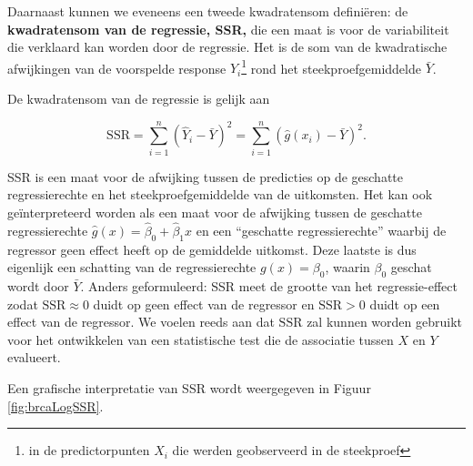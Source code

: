 \documentclass[
  12pt,dutch]{book}
\theoremstyle{definition}
\theoremstyle{definition}
\theoremstyle{definition}
\theoremstyle{definition}
\theoremstyle{remark}
\begin{document}
Daarnaast kunnen we eveneens een tweede kwadratensom definiëren: de \textbf{kwadratensom van de regressie, SSR,} die een maat is voor de variabiliteit die verklaard kan worden door de regressie. Het is de som van de kwadratische afwijkingen van de voorspelde response \(\hat{Y}_i\)\footnote{in de predictorpunten \(X_i\) die werden geobserveerd in de steekproef} rond het steekproefgemiddelde \(\bar Y\).

De kwadratensom van de regressie is gelijk aan

\[\text{SSR} = \sum_{i=1}^n (\hat{Y}_i - \bar{Y})^2 = \sum_{i=1}^n (\hat{g}(x_i) - \bar{Y})^2.\]

SSR is een maat voor de afwijking tussen de predicties op de geschatte regressierechte en het steekproefgemiddelde van de uitkomsten.
Het kan ook geïnterpreteerd worden als een maat voor de afwijking tussen de geschatte regressierechte \(\hat{g}(x)=\hat\beta_0+\hat\beta_1x\) en een ``geschatte regressierechte'' waarbij de regressor geen effect heeft op de gemiddelde uitkomst.
Deze laatste is dus eigenlijk een schatting van de regressierechte \(g(x)=\beta_0\), waarin \(\beta_0\) geschat wordt door \(\bar{Y}\).
Anders geformuleerd: SSR meet de grootte van het regressie-effect zodat \(\text{SSR} \approx 0\) duidt op geen effect van de regressor en \(\text{SSR}>0\) duidt op een effect van de regressor. We voelen reeds aan dat \(\text{SSR}\) zal kunnen worden gebruikt voor het ontwikkelen van een statistische test die de associatie tussen \(X\) en \(Y\) evalueert.

Een grafische interpretatie van SSR wordt weergegeven in Figuur \ref{fig:brcaLogSSR}.
\end{document}
